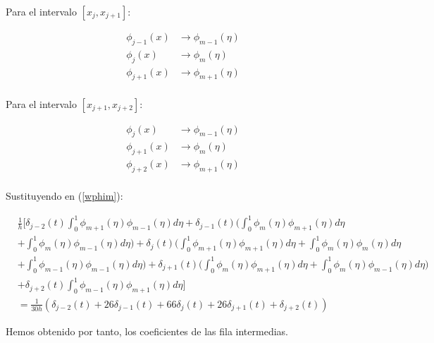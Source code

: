 \begin{itemize}
Para el intervalo $[x_{j},x_{j+1}]$:

\begin{align*}
   \phi_{j-1}(x) & \rightarrow \phi_{m-1}(\eta)\\
   \phi_{j}(x) & \rightarrow \phi_{m}(\eta)\\
   \phi_{j+1}(x) & \rightarrow \phi_{m+1}(\eta)\\
\end{align*}

Para el intervalo $[x_{j+1},x_{j+2}]$:

\begin{align*}
   \phi_{j}(x) & \rightarrow \phi_{m-1}(\eta)\\
   \phi_{j+1}(x) & \rightarrow \phi_{m}(\eta)\\
   \phi_{j+2}(x) & \rightarrow \phi_{m+1}(\eta)\\
\end{align*}

Sustituyendo en (\ref{wphim}):

\begin{align*}
   & \frac{1}{h}\Bigg[\delta_{j-2}(t)\int_{0}^{1}\phi_{m+1}(\eta)\phi_{m-1}(\eta) d\eta+\delta_{j-1}(t)\Big(\int_{0}^{1}\phi_{m}(\eta)\phi_{m+1}(\eta)d\eta\\
    & +\int_{0}^{1}\phi_{m}(\eta)\phi_{m-1}(\eta)d\eta\Big)+\delta_{j}(t)\Big(\int_{0}^{1}\phi_{m+1}(\eta)\phi_{m+1}(\eta)d\eta+\int_{0}^{1}\phi_{m}(\eta)\phi_{m}(\eta)d\eta\\
    & +\int_{0}^{1}\phi_{m-1}(\eta)\phi_{m-1}(\eta)d\eta\Big)+\delta_{j+1}(t)\Big(\int_{0}^{1}\phi_{m}(\eta)\phi_{m+1}(\eta)d\eta+\int_{0}^{1}\phi_{m}(\eta)\phi_{m-1}(\eta)d\eta\Big)\\
    & +\delta_{j+2}(t)\int_{0}^{1}\phi_{m-1}(\eta)\phi_{m+1}(\eta)d\eta \Bigg]\\
    & = \frac{1}{30h}(\delta_{j-2}(t)+26\delta_{j-1}(t)+66\delta_{j}(t)+26\delta_{j+1}(t)+\delta_{j+2}(t))
\end{align*}
   
   Hemos obtenido por tanto, los coeficientes de las fila intermedias.

\end{itemize}

